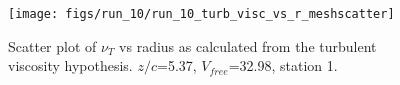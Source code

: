 \begin{figure}[H]
\centering
\texttt{[image: figs/run\_10/run\_10\_turb\_visc\_vs\_r\_meshscatter]}
\caption{Scatter plot of $\nu_T$ vs radius as calculated from the turbulent viscosity hypothesis. $z/c$=5.37, $V_{free}$=32.98, station 1.}
\label{fig:run_10_turb_visc_vs_r_meshscatter}
\end{figure}


